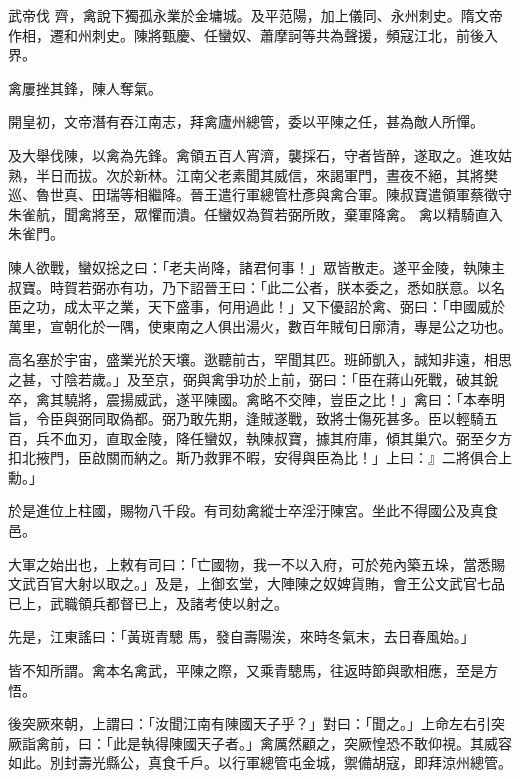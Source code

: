 \begin{pinyinscope}
 武帝伐
 齊，禽說下獨孤永業於金墉城。及平范陽，加上儀同、永州刺史。隋文帝作相，遷和州刺史。陳將甄慶、任蠻奴、蕭摩訶等共為聲援，頻寇江北，前後入界。



 禽屢挫其鋒，陳人奪氣。



 開皇初，文帝潛有吞江南志，拜禽廬州總管，委以平陳之任，甚為敵人所憚。



 及大舉伐陳，以禽為先鋒。禽領五百人宵濟，襲採石，守者皆醉，遂取之。進攻姑熟，半日而拔。次於新林。江南父老素聞其威信，來謁軍門，晝夜不絕，其將樊巡、魯世真、田瑞等相繼降。晉王遣行軍總管杜彥與禽合軍。陳叔寶遣領軍蔡徵守朱雀航，聞禽將至，眾懼而潰。任蠻奴為賀若弼所敗，棄軍降禽。
 禽以精騎直入朱雀門。



 陳人欲戰，蠻奴捴之曰：「老夫尚降，諸君何事！」眾皆散走。遂平金陵，執陳主叔寶。時賀若弼亦有功，乃下詔晉王曰：「此二公者，朕本委之，悉如朕意。以名臣之功，成太平之業，天下盛事，何用過此！」又下優詔於禽、弼曰：「申國威於萬里，宣朝化於一隅，使東南之人俱出湯火，數百年賊旬日廓清，專是公之功也。



 高名塞於宇宙，盛業光於天壤。逖聽前古，罕聞其匹。班師凱入，誠知非遠，相思之甚，寸陰若歲。」及至京，弼與禽爭功於上前，弼曰：「臣在蔣山死戰，破其銳卒，禽其驍將，震揚威武，遂平陳國。禽略不交陣，豈臣之比！」禽曰：「本奉明
 旨，令臣與弼同取偽都。弼乃敢先期，逢賊遂戰，致將士傷死甚多。臣以輕騎五百，兵不血刃，直取金陵，降任蠻奴，執陳叔寶，據其府庫，傾其巢穴。弼至夕方扣北掖門，臣啟關而納之。斯乃救罪不暇，安得與臣為比！」上曰：』二將俱合上勳。」



 於是進位上柱國，賜物八千段。有司劾禽縱士卒淫汙陳宮。坐此不得國公及真食邑。



 大軍之始出也，上敕有司曰：「亡國物，我一不以入府，可於苑內築五垛，當悉賜文武百官大射以取之。」及是，上御玄堂，大陣陳之奴婢貨賄，會王公文武官七品已上，武職領兵都督已上，及諸考使以射之。



 先是，江東謠曰：「黃斑青驄
 馬，發自壽陽涘，來時冬氣末，去日春風始。」



 皆不知所謂。禽本名禽武，平陳之際，又乘青驄馬，往返時節與歌相應，至是方悟。



 後突厥來朝，上謂曰：「汝聞江南有陳國天子乎？」對曰：「聞之。」上命左右引突厥詣禽前，曰：「此是執得陳國天子者。」禽厲然顧之，突厥惶恐不敢仰視。其威容如此。別封壽光縣公，真食千戶。以行軍總管屯金城，禦備胡寇，即拜涼州總管。




\end{pinyinscope}
